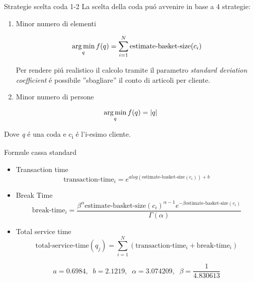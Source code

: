 \begin{frame}{Strategie scelta coda 1-2}
  La scelta della coda puó avvenire in base a 4 strategie:
  \begin{enumerate}
  \item Minor numero di elementi

    \begin{equation}
      \operatorname*{arg\,min}_q f(q) = \sum\limits_{i=1}^N \text{estimate-basket-size}(c_i) 
    \end{equation}

    Per rendere piú realistico il calcolo tramite il parametro
    \textit{standard deviation coefficient} é possibile ''sbagliare''
    il conto di articoli per cliente.
    
  \item Minor numero di persone
   \end{enumerate}
   
   \begin{equation}
     \operatorname*{arg\,min}_q f(q) = |q|
   \end{equation}

   Dove \textit{q} é una coda e c\textsubscript{i} é l'i-esimo
   cliente.   
 \end{frame}



\begin{frame}{Formule cassa standard}
  \begin{itemize}
  \item Transaction time
    \begin{equation}
      \text{transaction-time}_i = e^{a log(\text{estimate-basket-size}(c_i)) + b}
    \end{equation}
\item Break Time
  \begin{equation}
    \text{break-time}_i = \frac{\beta^{\alpha} \text{estimate-basket-size}(c_i)^{\alpha - 1} e^{- \beta \text{estimate-basket-size}(c_i)}}{\Gamma (\alpha)}
  \end{equation}  
\item Total service time
  \begin{equation}
    \text{total-service-time}(q_j) = \sum\limits_{i=1}^N \left( \text{transaction-time}_i + \text{break-time}_i \right)
  \end{equation}

  \begin{equation}
    a = 0.6984, \;\; b = 2.1219, \;\; \alpha = 3.074209, \;\; \beta = \frac{1}{4.830613}
  \end{equation}
  
\end{itemize}  
\end{frame}

